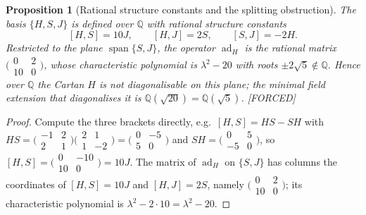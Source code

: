 \documentclass[11pt]{article}
\theoremstyle{plain}
\newtheorem{proposition}[theorem]{Proposition}
\theoremstyle{definition}
\theoremstyle{remark}
\newcommand{\Forced}{\textcolor{forcedc}{[FORCED]}}
\newcommand{\ad}{\operatorname{ad}}
\begin{document}
\begin{proposition}[Rational structure constants and the splitting obstruction]\label{prop:rational}
The basis $\{H,S,J\}$ is defined over $ℚ$ with rational structure constants
\[
[H,S]=10J,\qquad [H,J]=2S,\qquad [S,J]=-2H .
\]
Restricted to the plane $\operatorname{span}\{S,J\}$, the operator $\ad_H$ is the rational matrix $\bigl(\begin{smallmatrix}0&2\\10&0\end{smallmatrix}\bigr)$, whose characteristic polynomial is $λ^{2}-20$ with roots $\pm2\sqrt5\notin ℚ$. Hence over $ℚ$ the Cartan $H$ is \emph{not} diagonalisable on this plane; the minimal field extension that diagonalises it is $ℚ(\sqrt{20})=ℚ(\sqrt5)$. \Forced
\end{proposition}
\begin{proof}
Compute the three brackets directly, e.g.\ $[H,S]=HS-SH$ with $HS=\bigl(\begin{smallmatrix}-1&2\\2&1\end{smallmatrix}\bigr)\bigl(\begin{smallmatrix}2&1\\1&-2\end{smallmatrix}\bigr)=\bigl(\begin{smallmatrix}0&-5\\5&0\end{smallmatrix}\bigr)$ and $SH=\bigl(\begin{smallmatrix}0&5\\-5&0\end{smallmatrix}\bigr)$, so $[H,S]=\bigl(\begin{smallmatrix}0&-10\\10&0\end{smallmatrix}\bigr)=10J$. The matrix of $\ad_H$ on $\{S,J\}$ has columns the coordinates of $[H,S]=10J$ and $[H,J]=2S$, namely $\bigl(\begin{smallmatrix}0&2\\10&0\end{smallmatrix}\bigr)$; its characteristic polynomial is $λ^{2}-2\cdot10=λ^{2}-20$.
\end{proof}
\end{document}
